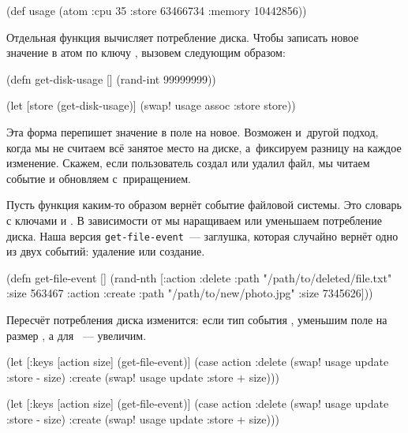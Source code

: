 \begin{clojure}
(def usage
  (atom {:cpu 35
         :store 63466734
         :memory 10442856}))
\end{clojure}

Отдельная функция вычисляет потребление диска. Чтобы записать новое значение в
атом по ключу , вызовем  следующим образом:

\begin{clojure}
(defn get-disk-usage []
  (rand-int 99999999))

(let [store (get-disk-usage)]
  (swap! usage assoc :store store))
\end{clojure}

Эта форма перепишет значение в поле  на новое. Возможен и~другой
подход, когда мы не считаем всё занятое место на диске, а~фиксируем разницу на
каждое изменение. Скажем, если пользователь создал или удалил файл, мы читаем
событие и обновляем  с~приращением.

Пусть функция  каким-то образом вернёт событие файловой
системы. Это словарь с ключами  и . В зависимости от
 мы наращиваем или уменьшаем потребление диска. Наша версия
\texttt{get-file-event}~--- заглушка, которая случайно вернёт одно из двух
событий: удаление или создание.

\begin{clojure}
(defn get-file-event []
  (rand-nth
   [{:action :delete
     :path "/path/to/deleted/file.txt"
     :size 563467}
    {:action :create
     :path "/path/to/new/photo.jpg"
     :size 7345626}]))
\end{clojure}

Пересчёт потребления диска изменится: если тип события , уменьшим
поле  на размер , а для ~--- увеличим.

\ifnarrow

\begin{clojure}
(let [{:keys [action size]}
      (get-file-event)]
  (case action
    :delete
    (swap! usage update :store - size)
    :create
    (swap! usage update :store + size)))
\end{clojure}

\else

\begin{clojure}
(let [{:keys [action size]} (get-file-event)]
  (case action
    :delete
    (swap! usage update :store - size)
    :create
    (swap! usage update :store + size)))
\end{clojure}

